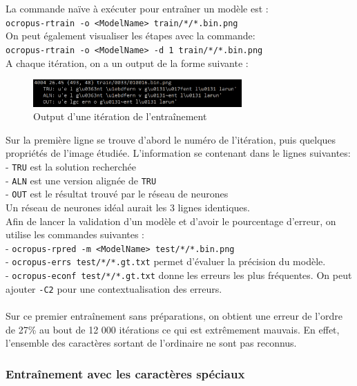 \documentclass{article}
\begin{document}
La commande naïve à exécuter pour entraîner un modèle est : \\
\texttt{ocropus-rtrain -o <ModelName> train/*/*.bin.png} \\
On peut également visualiser les étapes avec la commande: \\
\texttt{ocropus-rtrain -o <ModelName> -d 1 train/*/*.bin.png} \\

\noindent A chaque itération, on a un output de la forme suivante : 

\begin{figure}[!h] 
    \center
    \includegraphics[width=8cm]{screen_output.png}
    \caption{Output d'une itération de l'entraînement}
    \label{API}
\end{figure}

Sur la première ligne se trouve d'abord le numéro de l'itération, puis quelques propriétés de l'image étudiée. L'information se contenant dans le lignes suivantes: \\
- \texttt{TRU} est la solution recherchée \\
- \texttt{ALN} est une version alignée de \texttt{TRU} \\
- \texttt{OUT} est le résultat trouvé par le réseau de neurones \\
Un réseau de neurones idéal aurait les 3 lignes identiques. \\

Afin de lancer la validation d'un modèle et d'avoir le pourcentage d'erreur, on utilise les commandes suivantes : \\
- \texttt{ocropus-rpred -m <ModelName> test/*/*.bin.png} \\
- \texttt{ocropus-errs test/*/*.gt.txt} permet d'évaluer la précision du modèle. \\
- \texttt{ocropus-econf test/*/*.gt.txt} donne les erreurs les plus fréquentes.
On peut ajouter \texttt{-C2} pour une contextualisation des erreurs. \\
\\
Sur ce premier entraînement sans préparations, on obtient une erreur de l'ordre de 27\% au bout de 12 000 itérations ce qui est extrêmement mauvais. En effet, l'ensemble des caractères sortant de l'ordinaire ne sont pas reconnus.

\subsubsection{Entraînement avec les caractères spéciaux}
\end{document}
